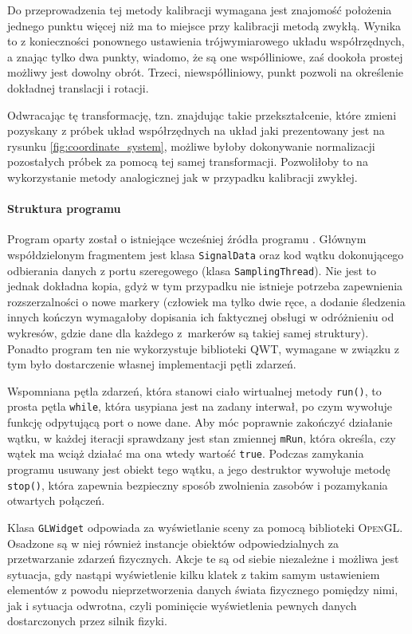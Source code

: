 Do przeprowadzenia tej metody kalibracji wymagana jest znajomość położenia jednego punktu więcej niż ma to miejsce przy kalibracji metodą zwykłą. Wynika to z konieczności ponownego ustawienia trójwymiarowego układu współrzędnych, a znając tylko dwa punkty, wiadomo, że są one współliniowe, zaś dookoła prostej możliwy jest dowolny obrót. Trzeci, niewspółliniowy, punkt pozwoli na określenie dokładnej translacji i rotacji.

Odwracając tę transformację, tzn. znajdując takie przekształcenie, które zmieni pozyskany z próbek układ współrzędnych na układ jaki prezentowany jest na rysunku \ref{fig:coordinate_system}, możliwe byłoby dokonywanie normalizacji pozostałych próbek za pomocą tej samej transformacji. Pozwoliłoby to na wykorzystanie metody analogicznej jak w przypadku kalibracji zwykłej.

\paragraph{Struktura programu}
Program oparty został o istniejące wcześniej źródła programu . Głównym współdzielonym fragmentem jest klasa \verb|SignalData| oraz kod wątku dokonującego odbierania danych z portu szeregowego (klasa \verb|SamplingThread|). Nie jest to jednak dokładna kopia, gdyż w tym przypadku nie istnieje potrzeba zapewnienia rozszerzalności o nowe markery (człowiek ma tylko dwie ręce, a dodanie śledzenia innych kończyn wymagałoby dopisania ich faktycznej obsługi \ppauza w odróżnieniu od wykresów, gdzie dane dla każdego z~markerów są takiej samej struktury). Ponadto program ten nie wykorzystuje biblioteki \textsc{QWT}, wymagane w związku z tym było dostarczenie własnej implementacji pętli zdarzeń.

Wspomniana pętla zdarzeń, która stanowi ciało wirtualnej metody \verb|run()|, to prosta pętla \verb|while|, która usypiana jest na zadany interwał, po czym wywołuje funkcję odpytującą port o nowe dane. Aby móc poprawnie zakończyć działanie wątku, w każdej iteracji sprawdzany jest stan zmiennej \verb|mRun|, która określa, czy wątek ma wciąż działać \ppauza ma ona wtedy wartość \verb|true|. Podczas zamykania programu usuwany jest obiekt tego wątku, a jego destruktor wywołuje metodę \verb|stop()|, która zapewnia bezpieczny sposób zwolnienia zasobów i pozamykania otwartych połączeń.

Klasa \verb|GLWidget| odpowiada za wyświetlanie sceny za pomocą biblioteki \textsc{OpenGL}. Osadzone są w niej również instancje obiektów odpowiedzialnych za przetwarzanie zdarzeń fizycznych. Akcje te są od siebie niezależne i możliwa jest sytuacja, gdy nastąpi wyświetlenie kilku klatek z takim samym ustawieniem elementów z powodu nieprzetworzenia danych świata fizycznego pomiędzy nimi, jak i sytuacja odwrotna, czyli pominięcie wyświetlenia pewnych danych dostarczonych przez silnik fizyki.

